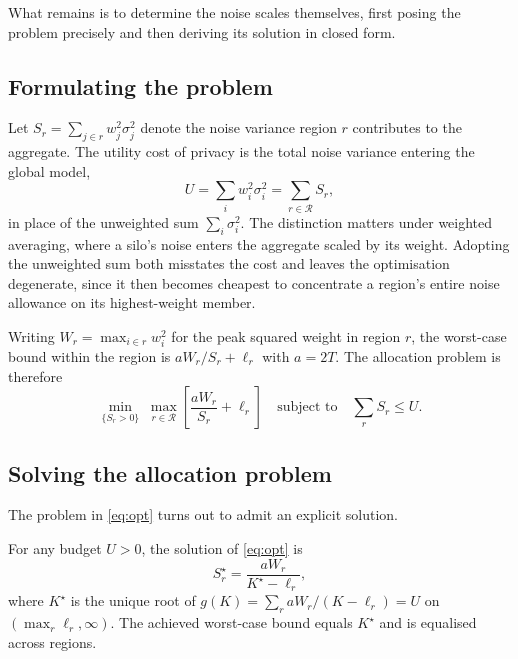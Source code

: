 \documentclass[acmsmall,screen,review,anonymous]{acmart}
\theoremstyle{acmdefinition}%
\newcommand{\Reg}{\mathcal{R}}
\begin{document}
What remains is to determine the noise scales themselves, first posing the
problem precisely and then deriving its solution in closed form.

\subsection{Formulating the problem}

Let $S_r = \sum_{j \in r} w_j^2 \sigma_j^2$ denote the noise variance region $r$
contributes to the aggregate. The utility cost of privacy is the total noise
variance entering the global model,
\begin{equation}
U = \sum_i w_i^2 \sigma_i^2 = \sum_{r \in \Reg} S_r ,
\label{eq:budget}
\end{equation}
in place of the unweighted sum $\sum_i \sigma_i^2$. The distinction matters under
weighted averaging, where a silo's noise enters the aggregate scaled by its
weight. Adopting the unweighted sum both misstates the cost and leaves the
optimisation degenerate, since it then becomes cheapest to concentrate a region's
entire noise allowance on its highest-weight member.

Writing $W_r = \max_{i \in r} w_i^2$ for the peak squared weight in region $r$,
the worst-case bound within the region is $a W_r / S_r + \ell_r$ with $a = 2T$.
The allocation problem is therefore
\begin{equation}
\min_{\{S_r > 0\}} \; \max_{r \in \Reg} \left[ \frac{a W_r}{S_r} + \ell_r \right]
\quad \text{subject to} \quad \sum_{r} S_r \le U .
\label{eq:opt}
\end{equation}

\subsection{Solving the allocation problem}

The problem in \eqref{eq:opt} turns out to admit an explicit solution.

\begin{theorem}
\label{thm:allocation}
For any budget $U > 0$, the solution of \eqref{eq:opt} is
\begin{equation}
S_r^{\star} = \frac{a W_r}{K^{\star} - \ell_r},
\label{eq:alloc}
\end{equation}
where $K^{\star}$ is the unique root of $g(K) = \sum_r a W_r / (K - \ell_r) = U$
on $(\max_r \ell_r, \infty)$. The achieved worst-case bound equals $K^{\star}$ and
is equalised across regions.
\end{theorem}
\end{document}
